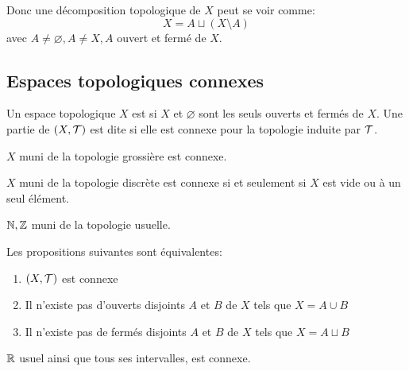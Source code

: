 \documentclass[french,a4paper,10pt]{article}
\begin{document}
	\medskip

	Donc une décomposition topologique de $X$ peut se voir comme:
	\[
		X = A\sqcup (X\setminus A)
	\]
	avec $A\ne\varnothing, A\ne X,A$ ouvert et fermé de $X$.

	\subsection{Espaces topologiques connexes}

	\begin{definition}
		Un espace topologique $X$ est  si $X$ et $\varnothing$ sont les seuls ouverts et fermés de $X$.
		Une partie de $(X,\cal T)$ est dite  si elle est connexe pour la topologie induite par $\cal T$.
	\end{definition}

	\begin{example}
		$X$ muni de la topologie grossière est connexe.
	\end{example}

	\begin{example}
		$X$ muni de la topologie discrète est connexe si et seulement si $X$ est vide ou à un seul élément.
	\end{example}

	\begin{example}
		$\mathbb{N}, \mathbb{Z}$ muni de la topologie usuelle.
	\end{example}

	\begin{remark}
		Les propositions suivantes sont équivalentes:
		\begin{enumerate}[label=$(\roman*)$]
			\item $(X,\cal T)$ est connexe
			\item Il n'existe pas d'ouverts disjoints $A$ et $B$ de $X$ tels que $X=A\cup B$
			\item Il n'existe pas de fermés disjoints $A$ et $B$ de $X$ tels que $X=A\sqcup B$
		\end{enumerate}
	\end{remark}

	\begin{theorem}
		$\mathbb{R}$ usuel ainsi que tous ses intervalles, est connexe.
	\end{theorem}
\end{document}
